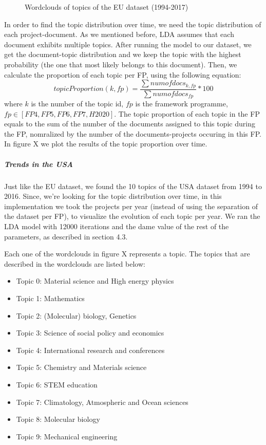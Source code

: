 \documentclass[12pt]{report}
\begin{document}
\begin{center}
\begin{figure}
\begin{tabular}{rcl}
\end{tabular}
\caption{Wordclouds of topics of the EU dataset (1994-2017)}
\end{figure}
\end{center}

In order to find the topic distribution over time, we need the topic
distribution of each project-document. As we mentioned before, LDA assumes that
each document exhibits multiple topics. After running the model to our dataset,
we get the document-topic distribution and we keep the topic with the highest
probability (the one that most likely belongs to this document). Then, we
calculate the proportion of each topic per FP, using the following equation:
\begin{equation}
topicProportion(k, fp) = \frac{\sum num of docs_{k,fp}}{\sum num of docs_{fp}} * 100
\end{equation}
where $k$ is the number of the topic id, $fp$ is the framework programme,
$fp \in [FP4, FP5, FP6, FP7, H2020]$. The topic proportion of each topic in 
the FP equals to the sum of the number of the documents assigned to this 
topic during the FP, nomralized by the number of the documents-projects 
occuring in this FP. In figure X we plot the results of the topic proportion 
over time.


\subparagraph{Trends in the USA	}

Just like the EU dataset, we found the 10 topics of the USA dataset from 1994 to
2016. Since, we're looking for the topic distribution over time, in this
implementation we took the projects per year (instead of using the separation of
the dataset per FP), to visualize the evolution of each topic per year. We ran
the LDA model with 12000 iterations and the dame value of the rest of the
parameters, as described in section 4.3.

Each one of the wordclouds in figure X represents a topic. The topics that are
described in the wordclouds are listed below:

\begin{itemize}
\item[] Topic 0: Material science and High energy physics
\item[] Topic 1: Mathematics
\item[] Topic 2: (Molecular) biology, Genetics
\item[] Topic 3: Science of social policy and economics
\item[] Topic 4: International research and conferences
\item[] Topic 5: Chemistry and Materials science
\item[] Topic 6: STEM education
\item[] Topic 7: Climatology, Atmospheric and Ocean sciences
\item[] Topic 8: Molecular biology 
\item[] Topic 9: Mechanical engineering
\end{itemize}
\end{document}

